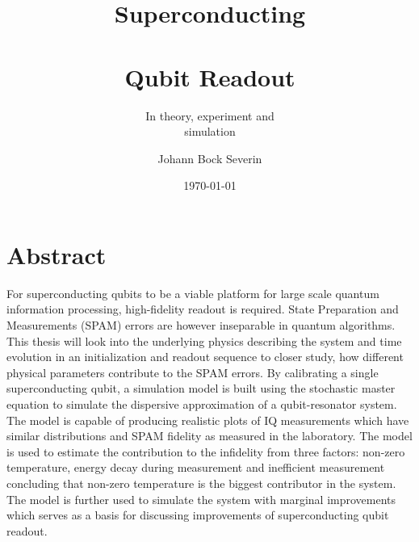 


\title{Superconducting \\ \\Qubit Readout}
\author{Johann Bock Severin}
\subtitle{In theory, experiment and \\simulation}
\date{\today}


% 
\maketitlepage

\chapter*{\centering Abstract}
For superconducting qubits to be a viable platform for large scale quantum information processing, high-fidelity readout is required. State Preparation and Measurements (SPAM) errors are however inseparable in quantum algorithms. This thesis will look into the underlying physics describing the system and time evolution in an initialization and readout sequence to closer study, how different physical parameters contribute to the SPAM errors. By calibrating a single superconducting qubit, a simulation model is built using the stochastic master equation to simulate the dispersive approximation of a qubit-resonator system. The model is capable of producing realistic plots of IQ measurements which have similar distributions and SPAM fidelity as measured in the laboratory. The model is used to estimate the contribution to the infidelity from three factors: non-zero temperature, energy decay during measurement and inefficient measurement concluding that non-zero temperature is the biggest contributor in the system. The model is further used to simulate the system with marginal improvements which serves as a basis for discussing improvements of superconducting qubit readout.





